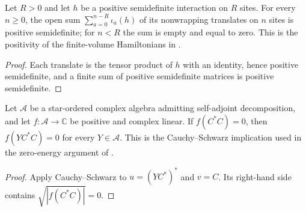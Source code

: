 \begin{lemma}
    \label{thm:open_interaction_matrix_posSemidef}
    \leanok
    Let $R>0$ and let $h$ be a positive semidefinite interaction on $R$
    sites. For every $n\geq0$, the open sum
    $\sum_{a=0}^{n-R}\iota_{a}(h)$ of its nonwrapping translates on $n$
    sites is positive semidefinite; for $n<R$ the sum is empty and equal
    to zero. This is the positivity of the finite-volume Hamiltonians in
    \cite[equation~(3.12)]{Nachtergaele1996Spectral}.
\end{lemma}
\begin{proof}\leanok
    Each translate is the tensor product of $h$ with an identity, hence
    positive semidefinite, and a finite sum of positive semidefinite
    matrices is positive semidefinite.
\end{proof}

\begin{lemma}
    \label{thm:positive_functional_vanishing_square}
    \leanok
    Let $\mathcal A$ be a star-ordered complex algebra admitting
    self-adjoint decomposition, and let $f:\mathcal A\to\mathbb C$ be
    positive and complex linear. If $f(C^*C)=0$, then $f(YC^*C)=0$ for
    every $Y\in\mathcal A$. This is the Cauchy--Schwarz implication used
    in the zero-energy argument of
    \cite[Section~6]{Nachtergaele1996Spectral}.
\end{lemma}
\begin{proof}\leanok
    Apply Cauchy--Schwarz to $u=(YC^*)^*$ and $v=C$.
    Its right-hand side contains $\sqrt{|f(C^*C)|}=0$.
\end{proof}

